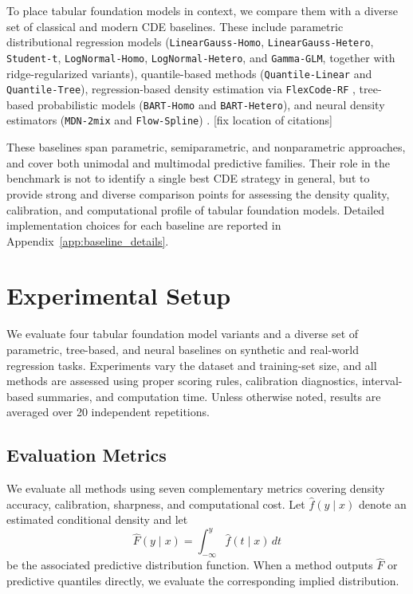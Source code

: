 \documentclass{article}
\newcommand{\method}[1]{\texttt{#1}}
\begin{document}
To place tabular foundation models in context, we compare them with a diverse
set of classical and modern CDE baselines. These include parametric
distributional regression models
(\method{LinearGauss-Homo}, \method{LinearGauss-Hetero}, \method{Student-t},
\method{LogNormal-Homo}, \method{LogNormal-Hetero}, and \method{Gamma-GLM},
together with ridge-regularized variants), quantile-based methods
(\method{Quantile-Linear} and \method{Quantile-Tree}), regression-based density
estimation via \method{FlexCode-RF} \citep{izbicki2017converting}, tree-based
probabilistic models (\method{BART-Homo} and \method{BART-Hetero}), and neural
density estimators (\method{MDN-2mix} and \method{Flow-Spline})
\citep{bishop1994mixture,chipman2010bart,he2019xbart,durkan2019nsf,
papamakarios2021normalizing}. [fix location of citations]

These baselines span parametric, semiparametric, and nonparametric approaches,
and cover both unimodal and multimodal predictive families. Their role in the
benchmark is not to identify a single best CDE strategy in general, but to
provide strong and diverse comparison points for assessing the density quality,
calibration, and computational profile of tabular foundation models. Detailed
implementation choices for each baseline are reported in
Appendix~\ref{app:baseline_details}.

\section{Experimental Setup}
\label{sec:setup}

We evaluate four tabular foundation model variants and a diverse set of
parametric, tree-based, and neural baselines on synthetic and real-world
regression tasks. Experiments vary the dataset and training-set size, and all
methods are assessed using proper scoring rules, calibration diagnostics,
interval-based summaries, and computation time. Unless otherwise noted, results
are averaged over 20 independent repetitions.

\subsection{Evaluation Metrics}
\label{sec:metrics}

We evaluate all methods using seven complementary metrics covering density
accuracy, calibration, sharpness, and computational cost. Let $\hat f(y\mid x)$
denote an estimated conditional density and let
\begin{equation}
  \hat F(y\mid x)=\int_{-\infty}^{y}\hat f(t\mid x)\,dt
  \label{eq:estimated_cdf}
\end{equation}
be the associated predictive distribution function. When a method outputs
$\hat F$ or predictive quantiles directly, we evaluate the corresponding implied
distribution.
\end{document}
